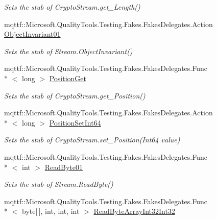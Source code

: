 \begin{DoxyCompactItemize}
\begin{DoxyCompactList}\small\item\em Sets the stub of Crypto\-Stream.\-get\-\_\-\-Length()\end{DoxyCompactList}\item 
mqttf\-::\-Microsoft.\-Quality\-Tools.\-Testing.\-Fakes.\-Fakes\-Delegates.\-Action \hyperlink{class_system_1_1_security_1_1_cryptography_1_1_fakes_1_1_stub_crypto_stream_a128a26d4a73808cd013d10bbcc94adf0}{Object\-Invariant01}
\begin{DoxyCompactList}\small\item\em Sets the stub of Stream.\-Object\-Invariant()\end{DoxyCompactList}\item 
mqttf\-::\-Microsoft.\-Quality\-Tools.\-Testing.\-Fakes.\-Fakes\-Delegates.\-Func\\*
$<$ long $>$ \hyperlink{class_system_1_1_security_1_1_cryptography_1_1_fakes_1_1_stub_crypto_stream_a2218d61f842a8f93e5f5b1b981657077}{Position\-Get}
\begin{DoxyCompactList}\small\item\em Sets the stub of Crypto\-Stream.\-get\-\_\-\-Position()\end{DoxyCompactList}\item 
mqttf\-::\-Microsoft.\-Quality\-Tools.\-Testing.\-Fakes.\-Fakes\-Delegates.\-Action\\*
$<$ long $>$ \hyperlink{class_system_1_1_security_1_1_cryptography_1_1_fakes_1_1_stub_crypto_stream_ac7d0fe7c1971ea534a218f522de4a76d}{Position\-Set\-Int64}
\begin{DoxyCompactList}\small\item\em Sets the stub of Crypto\-Stream.\-set\-\_\-\-Position(\-Int64 value)\end{DoxyCompactList}\item 
mqttf\-::\-Microsoft.\-Quality\-Tools.\-Testing.\-Fakes.\-Fakes\-Delegates.\-Func\\*
$<$ int $>$ \hyperlink{class_system_1_1_security_1_1_cryptography_1_1_fakes_1_1_stub_crypto_stream_a71d221a727ddaee5e5719430b045d7e0}{Read\-Byte01}
\begin{DoxyCompactList}\small\item\em Sets the stub of Stream.\-Read\-Byte()\end{DoxyCompactList}\item 
mqttf\-::\-Microsoft.\-Quality\-Tools.\-Testing.\-Fakes.\-Fakes\-Delegates.\-Func\\*
$<$ byte\mbox{[}$\,$\mbox{]}, int, int, int $>$ \hyperlink{class_system_1_1_security_1_1_cryptography_1_1_fakes_1_1_stub_crypto_stream_ac09c8e944c1aa3aa5247c82712f85169}{Read\-Byte\-Array\-Int32\-Int32}

\end{DoxyCompactItemize}
